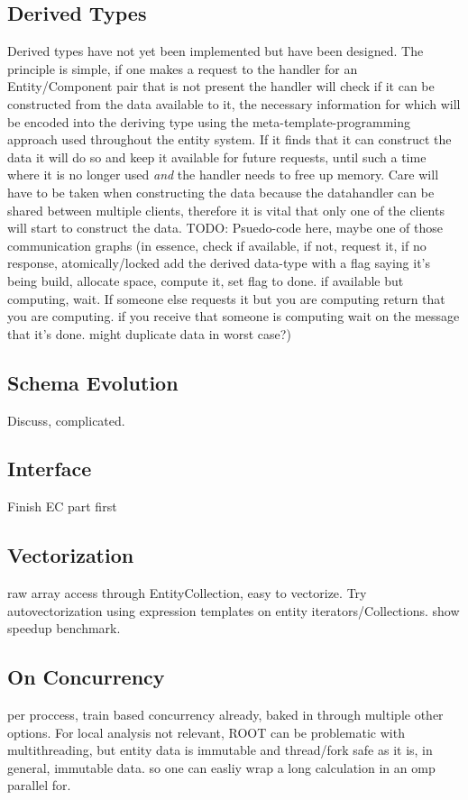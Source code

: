 \documentclass[a4paper]{report}
\begin{document}
\subsection{Derived Types}
Derived types have not yet been implemented but have been designed. The principle is simple, if one makes a request to the handler for an Entity/Component pair that is not
present the handler will check if it can be constructed from the data available to it, the necessary information for which will be encoded into the deriving type
using the meta-template-programming approach used throughout the entity system.
If it finds that it can construct the data it will do so and keep it available for future requests, until such a time where it is no longer used {\em and} the handler needs to
free up memory.
Care will have to be taken when constructing the data because the datahandler can be shared between multiple clients,
 therefore it is vital that only one of the clients will start to construct the data.
TODO: Psuedo-code here, maybe one of those communication graphs (in essence, check if available, if not, request it, if no response, atomically/locked add the derived data-type with a flag saying it's being build,
allocate space, compute it, set flag to done. if available but computing, wait. If someone else requests it but you are computing return that you are computing. if you receive that someone is computing wait on the message
that it's done. might duplicate data in worst case?)

\subsection{Schema Evolution}
Discuss, complicated.

\subsection{Interface}
Finish EC part first

\subsection{Vectorization}
raw array access through EntityCollection, easy to vectorize. Try autovectorization using
expression templates on entity iterators/Collections. show speedup benchmark.

\subsection{On Concurrency}
per proccess, train based concurrency already, baked in through multiple other options.
For local analysis not relevant, ROOT can be problematic with multithreading, but entity data is immutable and thread/fork safe as it is, in general,
immutable data. so one can easliy wrap a long calculation in an omp parallel for.
\end{document}
